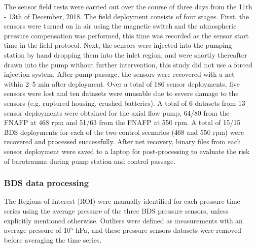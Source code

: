\documentclass[fleqn,10pt]{wlscirep}
\begin{document}
The sensor field tests were carried out over the course of three days from the 11th - 13th of December, 2018. The field deployment consists of four stages. First, the sensors were turned on in air using the magnetic switch and the atmospheric pressure compensation was performed, this time was recorded as the sensor start time in the field protocol. Next, the sensors were injected into the pumping station by hand dropping them into the inlet region, and were shortly thereafter drawn into the pump without further intervention, this study did not use a forced injection system. After pump passage, the sensors were recovered with a net within 2–5 min after deployment. Over a total of 186 sensor deployments, five sensors were lost and ten datasets were unusable due to severe damage to the sensors (e.g. ruptured housing, crushed batteries). A total of 6 datasets from 13 sensor deployments were obtained for the axial flow pump, 64/80 from the FNAFP at 468 rpm and 51/63 from the FNAFP at 550 rpm. A total of 15/15 BDS deployments for each of the two control scenarios (468 and 550 rpm) were recovered and processed successfully. After net recovery, binary files from each sensor deployment were saved to a laptop for post-processing to evaluate the risk of barotrauma during pump station and control passage.

\subsubsection*{BDS data processing}
The Regions of Interest (ROI) were manually identified for each pressure time series using the average pressure of the three BDS pressure sensors, unless explicitly mentioned otherwise. Outliers were defined as measurements with an average pressure of 10$^5$ hPa, and these pressure sensors datasets were removed before averaging the time series.

\end{document}
